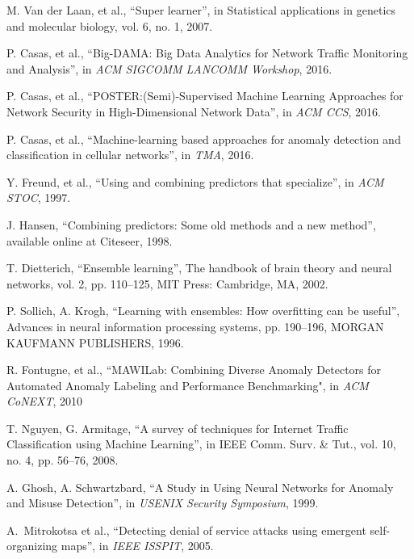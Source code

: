 \documentclass[10pt, conference, letterpaper]{IEEEtran}
\begin{document}
\begin{thebibliography}{99}
\balance
\vspace{1mm}
M. Van der Laan, et al., ``Super learner'', in Statistical applications in genetics and molecular biology, vol. 6, no. 1, 2007.

P. Casas, et al., ``Big-DAMA: Big Data Analytics for Network Traffic Monitoring and Analysis'', in \emph{ACM SIGCOMM LANCOMM Workshop}, 2016.

P. Casas, et al., ``POSTER:(Semi)-Supervised Machine Learning Approaches for Network Security in High-Dimensional Network Data'', in \emph{ACM CCS}, 2016.

P. Casas, et al., ``Machine-learning based approaches for anomaly detection and classification in cellular networks'', in \emph{TMA}, 2016.

Y. Freund, et al., ``Using and combining predictors that specialize'', in \emph{ACM STOC}, 1997.

J. Hansen, ``Combining predictors: Some old methods and a new method'', available online at Citeseer, 1998.

T. Dietterich, ``Ensemble learning'',  The handbook of brain theory and neural networks, vol. 2,  pp. 110--125, MIT Press: Cambridge, MA, 2002.

P. Sollich, A. Krogh, ``Learning with ensembles: How overfitting can be useful'', Advances in neural information processing systems, pp. 190--196, MORGAN KAUFMANN PUBLISHERS, 1996.

R. Fontugne, et al., ``MAWILab: Combining Diverse Anomaly Detectors for Automated Anomaly Labeling and Performance Benchmarking", in \emph{ACM CoNEXT}, 2010

T. Nguyen, G. Armitage, ``A survey of techniques for Internet Traffic Classification using Machine Learning'', in IEEE Comm. Surv. \& Tut., vol. 10, no. 4, pp. 56--76, 2008.

A. Ghosh, A. Schwartzbard, ``A Study in Using Neural Networks for Anomaly and Misuse Detection'', in \emph{USENIX Security Symposium}, 1999.

A.~Mitrokotsa et al., ``Detecting denial of service attacks using emergent self-organizing maps'', in \emph{IEEE ISSPIT}, 2005.


\end{thebibliography}
\end{document}
